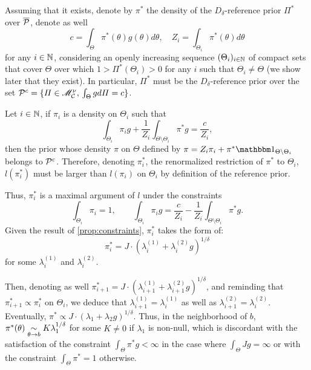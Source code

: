 Assuming that it exists, denote by $\pi^\ast$ the density of the $D_\delta$-reference prior $\varPi^\ast$ over $\overline{\mathcal{P}}$, denote as well
    \begin{equation}
        c = \int_{\Theta}\pi^\ast(\theta)g(\theta)d\theta,\quad Z_i = \int_{\Theta_i}\pi^\ast(\theta)d\theta
    \end{equation}
for any $i\in \mathbb{N}$, considering an openly increasing sequence $(\Theta_i)_{i\in\mathbb{N}}$ of compact sets that cover $\Theta$ over which $1>\varPi^\ast(\Theta_i)>0$ for any $i$ such that $\Theta_i\ne\Theta$ (we show later that they exist).
In particular, $\varPi^\ast$ must be the $D_\delta$-reference prior over the set $\mathcal{P}^c=\{\varPi\in\mathscr{M}_{\mathcal{C}}^\nu,\,\int_\Theta gd\varPi =c\}$. %

Let $i\in \mathbb{N}$, if $\pi_i$ is a density on $\Theta_i$ such that 
\begin{equation}
    \int_{\Theta_i}\pi_ig + \frac{1}{Z_i}\int_{\Theta\setminus\Theta_i}\pi^\ast g = \frac{c}{Z_i},
\end{equation}
then the prior whose density $\pi$ on $\Theta$ defined by $\pi=Z_i\pi_i+\pi^\ast\indic_{\Theta\setminus\Theta_i}$ %
belongs to $\mathcal{P}^c$.
Therefore, denoting $\pi^\ast_i$, the renormalized restriction of $\pi^\ast$ to $\Theta_i$, $l(\pi^\ast_i)$ must be larger than $l(\pi_i)$ on $\Theta_i$ by definition of the reference prior.

Thus, $\pi^\ast_i$ is a maximal argument of $l$ under the constraints 
    \begin{equation}
        \int_{\Theta_i}\pi_i = 1,\qquad \int_{\Theta_i}\pi_i g=\frac{c}{Z_i}-\frac{1}{Z_i}\int_{\Theta\setminus\Theta_i}\pi^\ast g.
    \end{equation}
Given the result of \cref{prop:constraints}, $\pi^\ast_i$ takes the form of:
    \begin{equation}
        \pi^\ast_i = J\cdot(\lambda^{(1)}_i+\lambda^{(2)}_ig)^{1/\delta}
    \end{equation}
for some $\lambda_i^{(1)}$ and $\lambda_i^{(2)}$.

Then, denoting as well $\pi^\ast_{i+1}=J\cdot(\lambda^{(1)}_{i+1}+\lambda^{(2)}_{i+1}g)^{1/\delta}$, and reminding that $\pi^\ast_{i+1}\propto\pi^\ast_i$ on $\Theta_i$, we deduce that $\lambda^{(1)}_{i+1}=\lambda^{(1)}_{i}$ as well as $\lambda^{(2)}_{i+1}=\lambda^{(2)}_{i}$.
Eventually, $\pi^\ast\propto J\cdot (\lambda_1+\lambda_2g)^{1/\delta}$.
Thus, in the neighborhood of $b$, $\pi^\ast(\theta)\underset{\theta\rightarrow b}{\sim}K\lambda_1^{1/\delta}$ for some $K\ne0$ if $\lambda_1$ is non-null, which is discordant with the satisfaction of the constraint $\int_\Theta\pi^\ast g<\infty$ in the case where $\int_\Theta Jg=\infty$ or with the constraint $\int_\Theta\pi^\ast =1$ otherwise.


